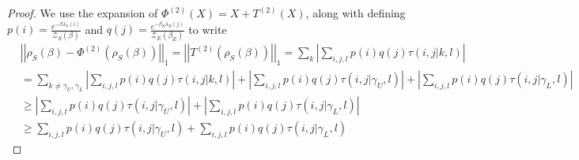 \documentclass{article}
\newcommand{\abs}[1]{\left| #1 \right|}
\newcommand{\norm}[1]{\left| \left| #1 \right| \right|}
\newcommand{\partfun}{\mathcal{Z}}
\begin{document}
\begin{proof}
     We use the expansion of $\Phi^{(2)}(X) = X + T^{(2)} (X)$, along with defining $p(i) = \frac{e^{-\beta \lambda_S(i)}}{\partfun_S(\beta)}$ and $q(j) = \frac{e^{-\beta_E \lambda_E(j)}}{\partfun_E(\beta_E)}$ to write
     \begin{align}
        &\norm{\rho_S(\beta) - \Phi^{(2)} (\rho_S(\beta))}_1 = \norm{T^{(2)}(\rho_S(\beta))}_1 = \sum_k \abs{\sum_{i,j,l} p(i) q(j) \tau(i,j | k,l)} \\
        &= \sum_{k \neq \gamma_U, \gamma_L} \abs{\sum_{i,j,l} p(i) q(j) \tau(i,j|k,l)} + \abs{\sum_{i,j,l} p(i) q(j) \tau(i,j | \gamma_U, l)} + \abs{\sum_{i,j,l} p(i) q(j) \tau(i,j | \gamma_L, l)} \\
        &\geq \abs{\sum_{i,j,l} p(i) q(j) \tau(i,j | \gamma_U, l)} + \abs{\sum_{i,j,l} p(i) q(j) \tau(i,j | \gamma_L, l)} \\
        &\geq \sum_{i,j,l} p(i) q(j) \tau(i,j | \gamma_U, l) + \sum_{i,j,l} p(i) q(j) \tau(i,j | \gamma_L, l)
     \end{align}
     

\end{proof}
\end{document}

